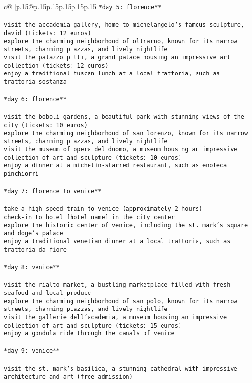 \documentclass{article}
\begin{document}
{\begin{supertabular}{c@{$\;$}|p{.15\linewidth}@{}p{.15\linewidth}p{.15\linewidth}p{.15\linewidth}p{.15\linewidth}p{.15\linewidth}}
{{{\tt **day 5: florence**\\ \tt \\ \tt * visit the accademia gallery, home to michelangelo's famous sculpture, david (tickets: 12 euros)\\ \tt * explore the charming neighborhood of oltrarno, known for its narrow streets, charming piazzas, and lively nightlife\\ \tt * visit the palazzo pitti, a grand palace housing an impressive art collection (tickets: 12 euros)\\ \tt * enjoy a traditional tuscan lunch at a local trattoria, such as trattoria sostanza\\ \tt \\ \tt **day 6: florence**\\ \tt \\ \tt * visit the boboli gardens, a beautiful park with stunning views of the city (tickets: 10 euros)\\ \tt * explore the charming neighborhood of san lorenzo, known for its narrow streets, charming piazzas, and lively nightlife\\ \tt * visit the museum of opera del duomo, a museum housing an impressive collection of art and sculpture (tickets: 10 euros)\\ \tt * enjoy a dinner at a michelin-starred restaurant, such as enoteca pinchiorri\\ \tt \\ \tt **day 7: florence to venice**\\ \tt \\ \tt * take a high-speed train to venice (approximately 2 hours)\\ \tt * check-in to hotel [hotel name] in the city center\\ \tt * explore the historic center of venice, including the st. mark's square and doge's palace\\ \tt * enjoy a traditional venetian dinner at a local trattoria, such as trattoria da fiore\\ \tt \\ \tt **day 8: venice**\\ \tt \\ \tt * visit the rialto market, a bustling marketplace filled with fresh seafood and local produce\\ \tt * explore the charming neighborhood of san polo, known for its narrow streets, charming piazzas, and lively nightlife\\ \tt * visit the gallerie dell'academia, a museum housing an impressive collection of art and sculpture (tickets: 15 euros)\\ \tt * enjoy a gondola ride through the canals of venice\\ \tt \\ \tt **day 9: venice**\\ \tt \\ \tt * visit the st. mark's basilica, a stunning cathedral with impressive architecture and art (free admission)\\ \tt }}}
\end{supertabular}}
\end{document}
